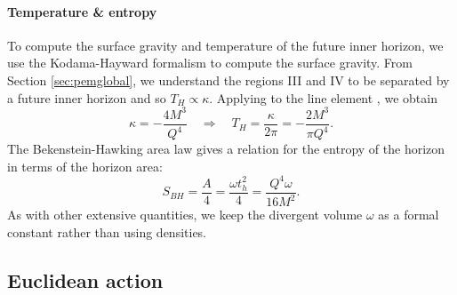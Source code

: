 \paragraph{Temperature \& entropy}

To compute the surface gravity and temperature of the future inner horizon, we use the Kodama-Hayward formalism to compute the surface gravity. From Section \ref{sec:pemglobal}, we understand the regions III and IV to be separated by a future inner horizon and so $T_H \propto \kappa$. Applying  to the line element , we obtain
\begin{equation}
\label{eq:EMtemp}
    \kappa = - \frac{4M^3}{Q^4} \quad \Rightarrow \quad T_H = \frac{\kappa}{2\pi} = - \frac{2 M^3}{\pi Q^4}.
\end{equation}
The Bekenstein-Hawking area law gives a relation for the entropy of the horizon in terms of the horizon area: 
\begin{equation*}
    S_{BH} = \frac{A}{4} = \frac{\omega t_h^2}{4} = \frac{Q^4 \omega}{16M^2}.
\end{equation*}
As with other extensive quantities, we keep the divergent volume $\omega$ as a formal constant rather than using densities. 

\subsection{Euclidean action}

